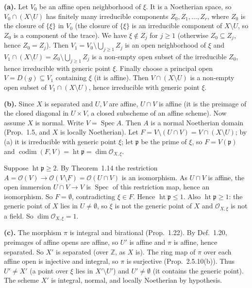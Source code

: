 \documentclass[11pt]{article}
\begin{document}
\textbf{(a).} Let $V_0$ be an affine open neighborhood of $\xi$. It is a Noetherian space, so $V_0\cap(X\setminus U)$ has finitely many irreducible components $Z_0,Z_1,\dots,Z_r$, where $Z_0$ is the closure of $\{\xi\}$ in $V_0$ (the closure of $\{\xi\}$ is an irreducible component of $X\setminus U$, so $Z_0$ is a component of the trace). We have $\xi\notin Z_j$ for $j\ge1$ (otherwise $Z_0\subseteq Z_j$, hence $Z_0=Z_j$). Then $V_1=V_0\setminus\bigcup_{j\ge1}Z_j$ is an open neighborhood of $\xi$ and $V_1\cap(X\setminus U)=Z_0\setminus\bigcup_{j\ge1}Z_j$ is a non-empty open subset of the irreducible $Z_0$, hence irreducible with generic point $\xi$. Finally choose a principal open $V=D(g)\subseteq V_1$ containing $\xi$ (it is affine). Then $V\cap(X\setminus U)$ is a non-empty open subset of $V_1\cap(X\setminus U)$, hence irreducible with generic point $\xi$.

\textbf{(b).} Since $X$ is separated and $U,V$ are affine, $U\cap V$ is affine (it is the preimage of the closed diagonal in $U\times V$, a closed subscheme of an affine scheme). Now assume $X$ is normal. Write $V=\operatorname{Spec}A$. Then $A$ is a normal Noetherian domain (Prop.~1.5, and $X$ is locally Noetherian). Let $F=V\setminus(U\cap V)=V\cap(X\setminus U)$; by (a) it is irreducible with generic point $\xi$; let $\mathfrak p$ be the prime of $\xi$, so $F=V(\mathfrak p)$ and $\operatorname{codim}(F,V)=\operatorname{ht}\mathfrak p=\dim\mathcal O_{X,\xi}$.

Suppose $\operatorname{ht}\mathfrak p\ge2$. By Theorem~1.14 the restriction $A=\mathcal O(V)\to\mathcal O(V\setminus F)=\mathcal O(U\cap V)$ is an isomorphism. As $U\cap V$ is affine, the open immersion $U\cap V\to V$ is $\operatorname{Spec}$ of this restriction map, hence an isomorphism. So $F=\emptyset$, contradicting $\xi\in F$. Hence $\operatorname{ht}\mathfrak p\le1$. Also $\operatorname{ht}\mathfrak p\ge1$: the generic point of $X$ lies in $U\neq\emptyset$, so $\xi$ is not the generic point of $X$ and $\mathcal O_{X,\xi}$ is not a field. So $\dim\mathcal O_{X,\xi}=1$.

\textbf{(c).} The morphism $\pi$ is integral and birational (Prop.~1.22). By Def.~1.20, preimages of affine opens are affine, so $U'$ is affine and $\pi$ is affine, hence separated. So $X'$ is separated (over $\mathbb Z$, as $X$ is). The ring map of $\pi$ over each affine open is injective and integral, so $\pi$ is surjective (Prop.~2.5.10(b)). Thus $U'\ne X'$ (a point over $\xi$ lies in $X'\setminus U'$) and $U'\neq\emptyset$ (it contains the generic point). The scheme $X'$ is integral, normal, and locally Noetherian by hypothesis.
\end{document}
